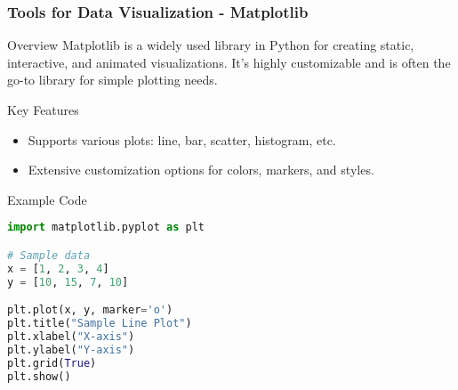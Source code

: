\documentclass[aspectratio=169]{beamer}
\begin{document}
\begin{frame}[fragile]
    \frametitle{Tools for Data Visualization - Matplotlib}
    \begin{block}{Overview}
        Matplotlib is a widely used library in Python for creating static, interactive, and animated visualizations. 
        It's highly customizable and is often the go-to library for simple plotting needs.
    \end{block}

    \begin{block}{Key Features}
        \begin{itemize}
            \item Supports various plots: line, bar, scatter, histogram, etc.
            \item Extensive customization options for colors, markers, and styles.
        \end{itemize}
    \end{block}

    \begin{block}{Example Code}
        \begin{lstlisting}[language=Python]
import matplotlib.pyplot as plt

# Sample data
x = [1, 2, 3, 4]
y = [10, 15, 7, 10]

plt.plot(x, y, marker='o')
plt.title("Sample Line Plot")
plt.xlabel("X-axis")
plt.ylabel("Y-axis")
plt.grid(True)
plt.show()
        \end{lstlisting}
    \end{block}
\end{frame}
\end{document}
